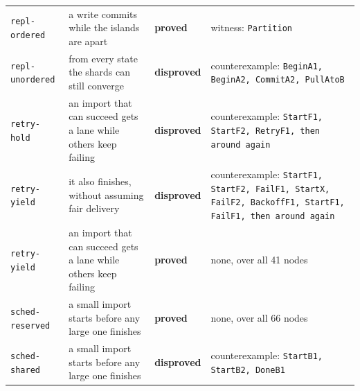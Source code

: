 \begin{longtable}{@{}p{}p{}p{}p{}@{}}
\texttt{repl-ordered} & a write commits while the islands are apart & \textbf{proved} & witness: \texttt{Partition} \\
\texttt{repl-unordered} & from every state the shards can still converge & \textbf{disproved} & counterexample: \texttt{BeginA1, BeginA2, CommitA2, PullAtoB} \\
\texttt{retry-hold} & an import that can succeed gets a lane while others keep failing & \textbf{disproved} & counterexample: \texttt{StartF1, StartF2, RetryF1, then around again} \\
\texttt{retry-yield} & it also finishes, without assuming fair delivery & \textbf{disproved} & counterexample: \texttt{StartF1, StartF2, FailF1, StartX, FailF2, BackoffF1, StartF1, FailF1, then around again} \\
\texttt{retry-yield} & an import that can succeed gets a lane while others keep failing & \textbf{proved} & none, over all 41 nodes \\
\texttt{sched-reserved} & a small import starts before any large one finishes & \textbf{proved} & none, over all 66 nodes \\
\texttt{sched-shared} & a small import starts before any large one finishes & \textbf{disproved} & counterexample: \texttt{StartB1, StartB2, DoneB1} \\
\bottomrule
\end{longtable}
